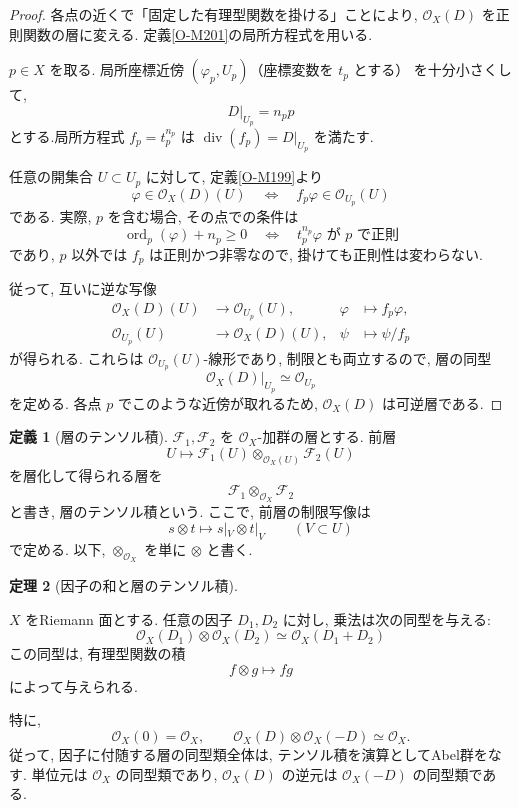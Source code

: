 \documentclass[dvipdfmx,a4paper,11pt]{article} %
\theoremstyle{definition}
\newtheorem{thm}{定理}[section]
\numberwithin{equation}{section}
\newtheorem{dfn}[thm]{定義}
\begin{document}
\begin{proof}
各点の近くで「固定した有理型関数を掛ける」ことにより, $\mathcal O_X(D)$ を正則関数の層に変える. 定義\ref{O-M201}の局所方程式を用いる.

$p\in X$ を取る.
局所座標近傍 $(\varphi_p,U_p)$（座標変数を $t_p$ とする） を十分小さくして, 
\[
D|_{U_p}=n_p p
\]
とする.局所方程式 $f_p=t_p^{n_p}$ は
$\operatorname{div}(f_p)=D|_{U_p}$ を満たす.

任意の開集合 $U\subset U_p$ に対して, 定義\ref{O-M199}より
\[
\varphi\in\mathcal O_X(D)(U)
\quad\Longleftrightarrow\quad
f_p\varphi\in\mathcal O_{U_p}(U)
\]
である.
実際, $p$ を含む場合, その点での条件は
\[
\operatorname{ord}_p(\varphi)+n_p\geq0
\quad\Longleftrightarrow\quad
t_p^{n_p}\varphi\text{ が }p\text{ で正則}
\]
であり, $p$ 以外では $f_p$ は正則かつ非零なので, 
掛けても正則性は変わらない.

従って, 互いに逆な写像
\[
\begin{aligned}
\mathcal O_X(D)(U)&\longrightarrow\mathcal O_{U_p}(U),
&\varphi&\longmapsto f_p\varphi,\\
\mathcal O_{U_p}(U)&\longrightarrow\mathcal O_X(D)(U),
&\psi&\longmapsto \psi/f_p
\end{aligned}
\]
が得られる.
これらは $\mathcal O_{U_p}(U)$-線形であり, 制限とも両立するので, 
層の同型
\[
\mathcal O_X(D)|_{U_p}\simeq\mathcal O_{U_p}
\]
を定める.
各点 $p$ でこのような近傍が取れるため, 
$\mathcal O_X(D)$ は可逆層である.
\end{proof}



\begin{dfn}[層のテンソル積]\label{rem-tensor-sheaves}
$\mathcal F_1,\mathcal F_2$ を $\mathcal O_X$-加群の層とする.
前層
\[
U\longmapsto
\mathcal F_1(U)\otimes_{\mathcal O_X(U)}\mathcal F_2(U)
\]
を層化して得られる層を
\[
\mathcal F_1\otimes_{\mathcal O_X}\mathcal F_2
\]
と書き, 層のテンソル積という.
ここで, 前層の制限写像は
\[
s\otimes t\longmapsto s|_V\otimes t|_V
\qquad(V\subset U)
\]
で定める.
以下, $\otimes_{\mathcal O_X}$ を単に $\otimes$ と書く.
\end{dfn}

\begin{thm}[因子の和と層のテンソル積]\label{O-M208}

$X$ をRiemann 面とする.
任意の因子 $D_1,D_2$ に対し, 乗法は次の同型を与える:
\[
\mathcal O_X(D_1)\otimes\mathcal O_X(D_2)
\simeq\mathcal O_X(D_1+D_2)
\]
この同型は, 有理型関数の積
\[
f\otimes g\longmapsto fg
\]
によって与えられる.

特に, 
\[
\mathcal O_X(0)=\mathcal O_X,\qquad
\mathcal O_X(D)\otimes\mathcal O_X(-D)\simeq\mathcal O_X.
\]
従って, 因子に付随する層の同型類全体は, 
テンソル積を演算としてAbel群をなす.
単位元は $\mathcal O_X$ の同型類であり, 
$\mathcal O_X(D)$ の逆元は $\mathcal O_X(-D)$ の同型類である.
\end{thm}
\end{document}
